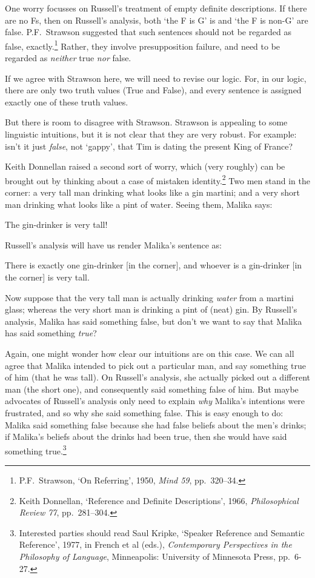 One worry focusses on Russell's treatment of empty definite descriptions. If there are no Fs, then on Russell's analysis, both `the F is G' is and  `the F is non-G' are false. P.F.\ Strawson suggested that such sentences should not be regarded as false, exactly.\footnote{P.F.\ Strawson, `On Referring', 1950, \emph{Mind 59}, pp.\ 320--34.} Rather, they involve presupposition failure, and need to be regarded as \emph{neither} true \emph{nor} false.

If we agree with Strawson here, we will need to revise our logic. For, in our logic, there are only two truth values (True and False), and every sentence is assigned exactly one of these truth values.

But there is room to disagree with Strawson. Strawson is appealing to some linguistic intuitions, but it is not clear that they are very robust. For example: isn't it just \emph{false}, not `gappy', that Tim is dating the present King of France?

Keith Donnellan raised a second sort of worry, which (very roughly) can be brought out by thinking about a case of mistaken identity.\footnote{Keith Donnellan, `Reference and Definite Descriptions', 1966, \emph{Philosophical Review 77}, pp.\ 281--304.} Two men stand in the corner: a very tall man drinking what looks like a gin martini; and a very short man drinking what looks like a pint of water. Seeing them, Malika says:
	\begin{samplesent}
		\item\label{sent:gindrinker} The gin-drinker is very tall!
	\end{samplesent}
Russell's analysis will have us render Malika's sentence as:
	\begin{compactlist}
		\item[\ref{sent:gindrinker}$'$.] There is exactly one gin-drinker [in the corner], and whoever is a gin-drinker [in the corner] is very tall.
	\end{compactlist}
Now suppose that the very tall man is actually drinking \emph{water} from a martini glass; whereas the very short man is drinking a pint of (neat) gin. By Russell's analysis, Malika has said something false, but don't we want to say that Malika has said something \emph{true}?

Again, one might wonder how clear our intuitions are on this case. We can all agree that Malika intended to pick out a particular man, and say something true of him (that he was tall). On Russell's analysis, she actually picked out a different man (the short one), and consequently said something false of him. But  maybe advocates of Russell's analysis only need to explain \emph{why} Malika's intentions were frustrated, and so why she said something false. This is easy enough to do:  Malika said something false because she had false beliefs about the men's drinks; if Malika's beliefs about the drinks had been true,  then she would have said something true.\footnote{Interested parties should read Saul Kripke, `Speaker Reference and Semantic Reference', 1977, in French et al (eds.), \emph{Contemporary Perspectives in the Philosophy of Language}, Minneapolis: University of Minnesota Press, pp.\ 6-27.}

